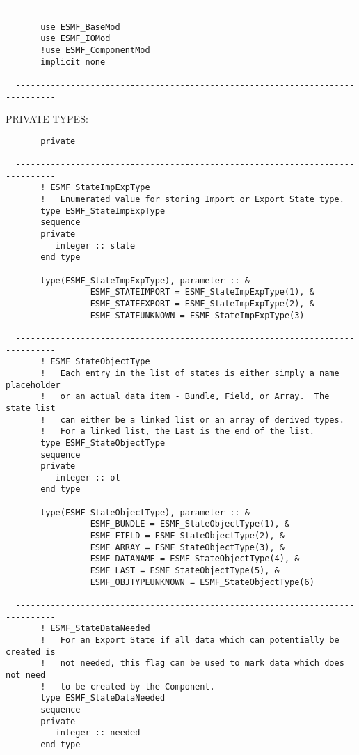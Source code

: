   
  ------------------------------------------------------------------------------
\begin{verbatim}       use ESMF_BaseMod
       use ESMF_IOMod
       !use ESMF_ComponentMod
       implicit none
 
  ------------------------------------------------------------------------------\end{verbatim}{\sf PRIVATE TYPES:}
\begin{verbatim}       private
 
  ------------------------------------------------------------------------------
       ! ESMF_StateImpExpType
       !   Enumerated value for storing Import or Export State type.
       type ESMF_StateImpExpType
       sequence
       private
          integer :: state
       end type
 
       type(ESMF_StateImpExpType), parameter :: &
                 ESMF_STATEIMPORT = ESMF_StateImpExpType(1), &
                 ESMF_STATEEXPORT = ESMF_StateImpExpType(2), &
                 ESMF_STATEUNKNOWN = ESMF_StateImpExpType(3)
 
  ------------------------------------------------------------------------------
       ! ESMF_StateObjectType
       !   Each entry in the list of states is either simply a name placeholder
       !   or an actual data item - Bundle, Field, or Array.  The state list
       !   can either be a linked list or an array of derived types.
       !   For a linked list, the Last is the end of the list.
       type ESMF_StateObjectType
       sequence
       private
          integer :: ot
       end type
 
       type(ESMF_StateObjectType), parameter :: &
                 ESMF_BUNDLE = ESMF_StateObjectType(1), &
                 ESMF_FIELD = ESMF_StateObjectType(2), &
                 ESMF_ARRAY = ESMF_StateObjectType(3), &
                 ESMF_DATANAME = ESMF_StateObjectType(4), &
                 ESMF_LAST = ESMF_StateObjectType(5), &
                 ESMF_OBJTYPEUNKNOWN = ESMF_StateObjectType(6)
 
  ------------------------------------------------------------------------------
       ! ESMF_StateDataNeeded
       !   For an Export State if all data which can potentially be created is
       !   not needed, this flag can be used to mark data which does not need
       !   to be created by the Component.
       type ESMF_StateDataNeeded
       sequence
       private
          integer :: needed
       end type
 

\end{verbatim}
